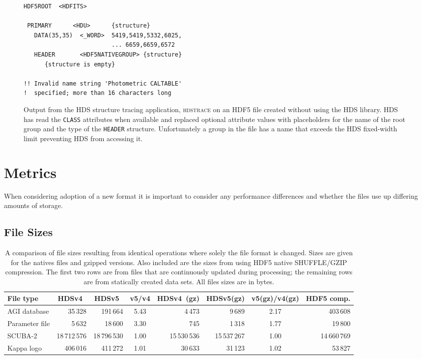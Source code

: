 \documentclass[final,authoryear,5p,times,twocolumn]{elsarticle}
\newcommand{\new}{HDSv5}
\newcommand{\old}{HDSv4}
\begin{document}
\begin{figure}
\small
\begin{verbatim}
HDF5ROOT  <HDFITS>

 PRIMARY      <HDU>      {structure}
   DATA(35,35)  <_WORD>  5419,5419,5332,6025,
                         ... 6659,6659,6572
   HEADER       <HDF5NATIVEGROUP> {structure}
      {structure is empty}

!! Invalid name string 'Photometric CALTABLE'
!  specified; more than 16 characters long
\end{verbatim}
\caption{Output from the HDS structure tracing application,
  \textsc{hdstrace} on an HDF5 file created without using the HDS
  library. HDS has read the \texttt{CLASS} attributes when available
  and replaced optional attribute values with placeholders for the
  name of the root group and the type of the \texttt{HEADER}
  structure. Unfortunately a group in the file has a name that exceeds
  the HDS fixed-width limit preventing HDS from accessing it.}
\label{fig:h5traces}
\end{figure}

\section{Metrics}

When considering adoption of a new format it is important to
consider any performance differences and whether the files use up
differing amounts of storage.

\subsection{File Sizes}

\begin{table}[ht]
  \caption{A comparison of file sizes resulting from identical
    operations where solely the file format is changed. Sizes are
    given for the natives files and gzipped versions. Also included
    are the sizes from using HDF5 native SHUFFLE/GZIP compression.
    The first two rows are from files that are continuously updated
    during processing; the remaining rows are from statically created
    data sets. All files sizes are in bytes.}
\label{tab:size}
\begin{center}
\begin{tabular}{lrrcrrcr}
\hline
File type &  \old\ & \new\  & v5/v4 & \old\ (gz) & \new (gz) & v5(gz)/v4(gz)
& HDF5 comp.\\ \hline

AGI database & 35\,328 & 191\,664 & 5.43 & 4\,473 & 9\,689& 2.17  & 403\,608\\
Parameter file & 5\,632 & 18\,600 & 3.30 & 745 & 1\,318 & 1.77 &  19\,800\\
SCUBA-2 & 18\,712\,576 & 18\,796\,530 & 1.00 & 15\,530\,536 &
15\,537\,267 & 1.00 & 14\,660\,769 \\
Kappa logo & 406\,016 & 411\,272 & 1.01 & 30\,633 & 31\,123 & 1.02 & 53\,827\\
\hline
\end{tabular}
\end{center}
\end{table}
\end{document}
